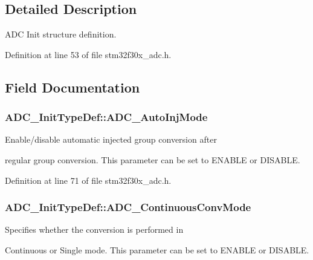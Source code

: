 \subsection{Detailed Description}
A\-D\-C Init structure definition. 

Definition at line 53 of file stm32f30x\-\_\-adc.\-h.



\subsection{Field Documentation}
\hypertarget{struct_a_d_c___init_type_def_a43be794a25a10b9ff810ac0ac2b0a7df}{
\subsubsection[{A\-D\-C\-\_\-\-Auto\-Inj\-Mode}]{ A\-D\-C\-\_\-\-Init\-Type\-Def\-::\-A\-D\-C\-\_\-\-Auto\-Inj\-Mode}}\label{struct_a_d_c___init_type_def_a43be794a25a10b9ff810ac0ac2b0a7df}
\begin{DoxyVerb}               Enable/disable automatic injected group conversion after
\end{DoxyVerb}
 regular group conversion. This parameter can be set to E\-N\-A\-B\-L\-E or D\-I\-S\-A\-B\-L\-E. 

Definition at line 71 of file stm32f30x\-\_\-adc.\-h.

\hypertarget{struct_a_d_c___init_type_def_a52e3f0d75cb726843c4db4512d42824c}{
\subsubsection[{A\-D\-C\-\_\-\-Continuous\-Conv\-Mode}]{ A\-D\-C\-\_\-\-Init\-Type\-Def\-::\-A\-D\-C\-\_\-\-Continuous\-Conv\-Mode}}\label{struct_a_d_c___init_type_def_a52e3f0d75cb726843c4db4512d42824c}
\begin{DoxyVerb}        Specifies whether the conversion is performed in
\end{DoxyVerb}
 Continuous or Single mode. This parameter can be set to E\-N\-A\-B\-L\-E or D\-I\-S\-A\-B\-L\-E. 

